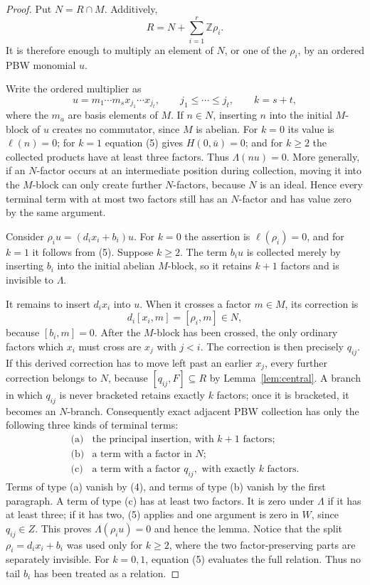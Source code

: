\documentclass[11pt]{amsart}
\theoremstyle{remark}
\newcommand{\Z}{\mathbb Z}
\begin{document}
\begin{proof}
Put $N=R\cap M$.  Additively,
\[
                     R=N+\sum_{i=1}^r\Z\rho_i.           \tag{6}
\]
It is therefore enough to multiply an element of $N$, or one of the
$\rho_i$, by an ordered PBW monomial $u$.

Write the ordered multiplier as
\[
 u=m_1\cdots m_sx_{j_1}\cdots x_{j_t},
 \qquad j_1\leq\cdots\leq j_t,
 \qquad k=s+t,
\]
where the $m_a$ are basis elements of $M$.  If $n\in N$, inserting $n$ into the
initial $M$-block of $u$ creates no commutator, since $M$ is abelian.
For $k=0$ its value is $\ell(n)=0$; for $k=1$ equation (5) gives
$H(0,\bar u)=0$; and for $k\geq2$ the collected products have at least
three factors.  Thus $\Lambda(nu)=0$.  More generally, if an
$N$-factor occurs at an intermediate position during collection, moving
it into the $M$-block can only create further $N$-factors, because $N$
is an ideal.  Hence every terminal term with at most two factors still
has an $N$-factor and has value zero by the same argument.

Consider $\rho_i u=(d_ix_i+b_i)u$.  For $k=0$ the assertion is
$\ell(\rho_i)=0$, and for $k=1$ it follows from (5).  Suppose
$k\geq2$.  The term $b_i u$ is collected merely by inserting $b_i$
into the initial abelian $M$-block, so it retains $k+1$ factors and is
invisible to $\Lambda$.

It remains to insert $d_ix_i$ into $u$.  When it crosses a factor
$m\in M$, its correction is
\[
 d_i[x_i,m]=[\rho_i,m]\in N,                             \tag{7}
\]
because $[b_i,m]=0$.  After the $M$-block has been crossed, the only
ordinary factors which $x_i$ must cross are $x_j$ with $j<i$.  The
correction is then precisely $q_{ij}$.  If this derived correction has
to move left past an earlier $x_j$, every further correction belongs
to $N$, because $[q_{ij},F]\subseteq R$ by
Lemma~\ref{lem:central}.  A branch in which $q_{ij}$ is never bracketed
retains exactly $k$ factors; once it is bracketed, it becomes an
$N$-branch.  Consequently exact adjacent PBW collection
has only the following three kinds of terminal terms:
\[
 \begin{array}{ll}
 \text{(a)}&\text{the principal insertion, with }k+1\text{ factors};\\
 \text{(b)}&\text{a term with a factor in }N;\\
 \text{(c)}&\text{a term with a factor }q_{ij},
              \text{ with exactly }k\text{ factors}.
 \end{array}                                             \tag{8}
\]
Terms of type (a) vanish by (4), and terms of type (b) vanish by the
first paragraph.  A term of type (c) has at least two factors.  It is
zero under $\Lambda$ if it has at least three; if it has two, (5)
applies and one argument is zero in $W$, since $q_{ij}\in Z$.
This proves $\Lambda(\rho_i u)=0$ and hence the lemma.
Notice that the split $\rho_i=d_ix_i+b_i$ was used only for
$k\geq2$, where the two factor-preserving parts are separately invisible.
For $k=0,1$, equation (5) evaluates the full relation.  Thus no tail
$b_i$ has been treated as a relation.
\end{proof}
\end{document}

